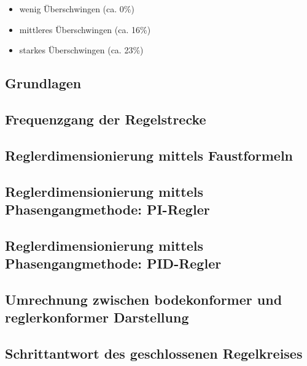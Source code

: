 \begin{itemize}
    \item
        wenig \"Uberschwingen (ca. 0\%)
    \item
        mittleres \"Uberschwingen (ca. 16\%)
    \item
        starkes \"Uberschwingen (ca. 23\%)
\end{itemize}

\subsection{Grundlagen}


\clearpage
\subsection{Frequenzgang der Regelstrecke}
\label{subs:frequenzgang}


\subsection{Reglerdimensionierung mittels Faustformeln}
\label{subs:faustformeln}


\subsection{Reglerdimensionierung mittels Phasengangmethode: PI-Regler}
\label{subs:phasengang:pi}


\subsection{Reglerdimensionierung mittels Phasengangmethode: PID-Regler}
\label{subs:phasengang:pid}


\subsection{Umrechnung zwischen bodekonformer und reglerkonformer Darstellung}
\label{subs:bode_regler}


\subsection{Schrittantwort des geschlossenen Regelkreises}

